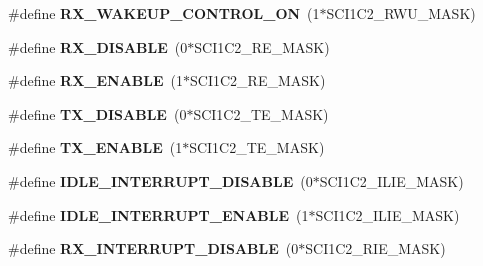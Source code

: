 \begin{DoxyCompactItemize}
\item 
\hypertarget{group__hal__hcs08_gafa441acd3cb8b71faf6211db701bd4bd}{\#define {\bfseries R\-X\-\_\-\-W\-A\-K\-E\-U\-P\-\_\-\-C\-O\-N\-T\-R\-O\-L\-\_\-\-O\-N}~(1$\ast$S\-C\-I1\-C2\-\_\-\-R\-W\-U\-\_\-\-M\-A\-S\-K)}\label{group__hal__hcs08_gafa441acd3cb8b71faf6211db701bd4bd}

\item 
\hypertarget{group__hal__hcs08_gaec484d0fae46f97debc24d8743c0b9f7}{\#define {\bfseries R\-X\-\_\-\-D\-I\-S\-A\-B\-L\-E}~(0$\ast$S\-C\-I1\-C2\-\_\-\-R\-E\-\_\-\-M\-A\-S\-K)}\label{group__hal__hcs08_gaec484d0fae46f97debc24d8743c0b9f7}

\item 
\hypertarget{group__hal__hcs08_ga503de2a6a495fceb78236de11743af62}{\#define {\bfseries R\-X\-\_\-\-E\-N\-A\-B\-L\-E}~(1$\ast$S\-C\-I1\-C2\-\_\-\-R\-E\-\_\-\-M\-A\-S\-K)}\label{group__hal__hcs08_ga503de2a6a495fceb78236de11743af62}

\item 
\hypertarget{group__hal__hcs08_gafe106e50390ad91020a5f8e91123cbd1}{\#define {\bfseries T\-X\-\_\-\-D\-I\-S\-A\-B\-L\-E}~(0$\ast$S\-C\-I1\-C2\-\_\-\-T\-E\-\_\-\-M\-A\-S\-K)}\label{group__hal__hcs08_gafe106e50390ad91020a5f8e91123cbd1}

\item 
\hypertarget{group__hal__hcs08_gaf1984a3b79957819c4156add3317994b}{\#define {\bfseries T\-X\-\_\-\-E\-N\-A\-B\-L\-E}~(1$\ast$S\-C\-I1\-C2\-\_\-\-T\-E\-\_\-\-M\-A\-S\-K)}\label{group__hal__hcs08_gaf1984a3b79957819c4156add3317994b}

\item 
\hypertarget{group__hal__hcs08_ga14bf84d23bef2a5772347e0daa49edcb}{\#define {\bfseries I\-D\-L\-E\-\_\-\-I\-N\-T\-E\-R\-R\-U\-P\-T\-\_\-\-D\-I\-S\-A\-B\-L\-E}~(0$\ast$S\-C\-I1\-C2\-\_\-\-I\-L\-I\-E\-\_\-\-M\-A\-S\-K)}\label{group__hal__hcs08_ga14bf84d23bef2a5772347e0daa49edcb}

\item 
\hypertarget{group__hal__hcs08_gaab16dc5a206e53be03c6ab93bca3ce59}{\#define {\bfseries I\-D\-L\-E\-\_\-\-I\-N\-T\-E\-R\-R\-U\-P\-T\-\_\-\-E\-N\-A\-B\-L\-E}~(1$\ast$S\-C\-I1\-C2\-\_\-\-I\-L\-I\-E\-\_\-\-M\-A\-S\-K)}\label{group__hal__hcs08_gaab16dc5a206e53be03c6ab93bca3ce59}

\item 
\hypertarget{group__hal__hcs08_ga6893ac5b107885a8eb763b7135cb0a40}{\#define {\bfseries R\-X\-\_\-\-I\-N\-T\-E\-R\-R\-U\-P\-T\-\_\-\-D\-I\-S\-A\-B\-L\-E}~(0$\ast$S\-C\-I1\-C2\-\_\-\-R\-I\-E\-\_\-\-M\-A\-S\-K)}\label{group__hal__hcs08_ga6893ac5b107885a8eb763b7135cb0a40}


\end{DoxyCompactItemize}
